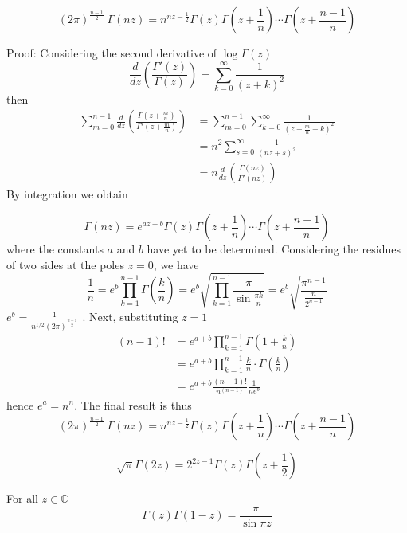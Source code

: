 \documentclass[12pt, oneside]{book}
\begin{document}
\begin{theorem}[Gauss]
    $$(2\pi)^{\frac{n-1}{2}} \ \Gamma(nz) = n^{ nz-\frac{1}{2}} \Gamma(z) \Gamma\left(z+\frac{1}{n}\right) \cdots \Gamma\left(z+\frac{n-1}{n}\right) $$

    Proof: Considering the second derivative of $\log \Gamma(z)$
    $$\frac{d}{d z} \left(\frac{\Gamma'(z)}{\Gamma (z)}\right) = \sum_{k=0}^{\infty} \frac{1}{(z+k)^2}$$
    then
    $$\begin{aligned}
            \sum_{m=0}^{n-1} \frac{d}{dz} \left( \frac{\Gamma(z+\frac{m}{n})}{\Gamma'(z+\frac{m}{n})}\right) &
            =\sum_{m=0}^{n-1}\sum_{k=0}^\infty \frac{1}{(z+\frac{m}{n}+k)^2}                                                                                               \\
                                                                                                             & = n^2 \sum_{s=0}^\infty \frac{1}{(nz+s)^2}                  \\
                                                                                                             & =n \frac{d}{dz} \left(\frac{\Gamma(nz)}{\Gamma'(nz)}\right)
        \end{aligned}
    $$
    By integration we obtain

    $$\Gamma(nz) = e^{az +b} \Gamma(z) \Gamma\left(z+\frac{1}{n}\right) \cdots \Gamma\left(z+\frac{n-1}{n}\right) $$
    where the constants $a$ and $b$ have yet to be determined. Considering the residues of two sides at the poles $z=0$, we have
    $$ \frac{1}{n}= e^b \prod_{k=1}^{n-1}\Gamma \left(\frac{k}{n}\right)=e^b \sqrt{\prod_{k=1}^{n-1}\frac{\pi}{\sin \frac{\pi k}{n} }}=e^b \sqrt{\frac{\pi^{n-1}}{\frac{n}{2^{n-1}}}}$$
    $e^b=\frac{1}{n^{1/2}(2\pi)^{\frac{n-1}{2}}}$
    . Next, substituting $z=1$
    $$
        \begin{aligned}
            (n-1)! & = e^{a+b}\prod_{k=1}^{n-1} \Gamma\left(1+ \frac{k}{n}\right)                \\
                   & = e^{a+b} \prod_{k=1}^{n-1} \frac{k}{n}\cdot \Gamma\left(\frac{k}{n}\right) \\
                   & = e^{a+b} \frac{(n-1)!}{n^(n-1) } \frac{1}{n e^b }
        \end{aligned}
    $$
    hence $e^a=n^{n}$. The final result is thus
    $$(2\pi)^{\frac{n-1}{2}} \ \Gamma(nz) = n^{nz-\frac{1}{2}} \Gamma(z) \Gamma\left(z+\frac{1}{n}\right) \cdots \Gamma\left(z+\frac{n-1}{n}\right) $$
\end{theorem}
\begin{corollary}
    $$\sqrt{\pi} \Gamma (2 z) = 2^{2z-1} \Gamma(z) \Gamma(z+\frac{1}{2}) $$
\end{corollary}
\begin{theorem}
    For all $z\in\mathbb{C}$
    $$\Gamma(z) \Gamma(1-z)=\frac{\pi}{\sin \pi z}$$
\end{theorem}
\end{document}
